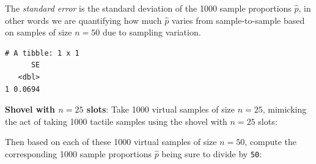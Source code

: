 \documentclass[12pt,]{krantz}
\makeatletter
\newenvironment{Shaded}{\begin{snugshade}}{\end{snugshade}}
\newcommand{\KeywordTok}[1]{\textcolor[rgb]{0.27,0.27,0.27}{\textbf{#1}}}
\newcommand{\DataTypeTok}[1]{\textcolor[rgb]{0.27,0.27,0.27}{#1}}
\newcommand{\DecValTok}[1]{\textcolor[rgb]{0.06,0.06,0.06}{#1}}
\newcommand{\StringTok}[1]{\textcolor[rgb]{0.5,0.5,0.5}{#1}}
\newcommand{\OperatorTok}[1]{\textcolor[rgb]{0.43,0.43,0.43}{\textbf{#1}}}
\newcommand{\NormalTok}[1]{#1}
\newenvironment{kframe}{%
\medskip{}
\setlength{\fboxsep}{.8em}
 \def\at@end@of@kframe{}%
 \ifinner\ifhmode%
  \def\at@end@of@kframe{\end{minipage}}%
  \begin{minipage}{\columnwidth}%
 \fi\fi%
 \def\FrameCommand##1{\hskip\@totalleftmargin \hskip-\fboxsep
 \colorbox{shadecolor}{##1}\hskip-\fboxsep
     \hskip-\linewidth \hskip-\@totalleftmargin \hskip\columnwidth}%
 \MakeFramed {\advance\hsize-\width
   \@totalleftmargin\z@ \linewidth\hsize
   \@setminipage}}%
 {\par\unskip\endMakeFramed%
 \at@end@of@kframe}
\renewenvironment{Shaded}{\begin{kframe}}{\end{kframe}}
\makeatother
\begin{document}
\begin{Shaded}
\end{Shaded}

The \emph{standard error} is the standard deviation of the 1000 sample
proportions \(\widehat{p}\), in other words we are quantifying how much
\(\widehat{p}\) varies from sample-to-sample based on samples of size
\(n=50\) due to sampling variation.

\begin{Shaded}
\end{Shaded}

\begin{verbatim}
# A tibble: 1 x 1
      SE
   <dbl>
1 0.0694
\end{verbatim}

\textbf{Shovel with \(n=25\) slots}: Take 1000 virtual samples of size
\(n=25\), mimicking the act of taking 1000 tactile samples using the
shovel with \(n=25\) slots:

\begin{Shaded}
\end{Shaded}

Then based on each of these 1000 virtual samples of size \(n=50\),
compute the corresponding 1000 sample proportions \(\widehat{p}\) being
sure to divide by \texttt{50}:
\end{document}
